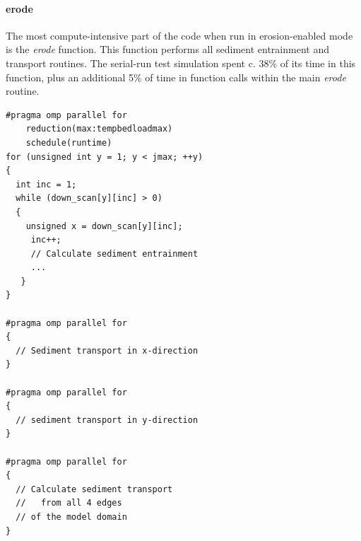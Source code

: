 \paragraph*{erode}
The most compute-intensive part of the code when run in erosion-enabled mode is the \textit{erode} function. This function performs all sediment entrainment and transport routines. The serial-run test simulation spent c. 38\% of its time in this function, plus an additional 5\% of time in function calls within the main \textit{erode} routine. 

\begin{verbatim}
#pragma omp parallel for 
    reduction(max:tempbedloadmax) 
    schedule(runtime) 
for (unsigned int y = 1; y < jmax; ++y) 
{
  int inc = 1;
  while (down_scan[y][inc] > 0)
  {
    unsigned x = down_scan[y][inc];
     inc++;
     // Calculate sediment entrainment
     ...
   }
}

#pragma omp parallel for
{
  // Sediment transport in x-direction
}

#pragma omp parallel for
{
  // sediment transport in y-direction
}

#pragma omp parallel for
{
  // Calculate sediment transport
  //   from all 4 edges
  // of the model domain
}

\end{verbatim}

